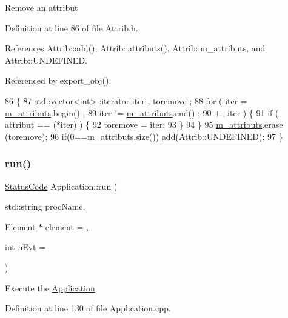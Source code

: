 Remove an attribut 

Definition at line 86 of file Attrib.\+h.



References Attrib\+::add(), Attrib\+::attributs(), Attrib\+::m\+\_\+attributs, and Attrib\+::\+U\+N\+D\+E\+F\+I\+N\+ED.



Referenced by export\+\_\+obj().


\begin{DoxyCode}
86                                \{
87     std::vector<int>::iterator iter , toremove ;
88     \textcolor{keywordflow}{for} ( iter  = \hyperlink{classAttrib_ac4bd58a0cc6b38a3b711d609a3d3aacc}{m\_attributs}.begin() ;
89           iter != \hyperlink{classAttrib_ac4bd58a0cc6b38a3b711d609a3d3aacc}{m\_attributs}.end()   ;
90           ++iter ) \{
91       \textcolor{keywordflow}{if} ( attribut == (*iter) ) \{
92         toremove = iter;
93       \}
94     \}
95     \hyperlink{classAttrib_ac4bd58a0cc6b38a3b711d609a3d3aacc}{m\_attributs}.erase (toremove);
96     \textcolor{keywordflow}{if}(0==\hyperlink{classAttrib_ac4bd58a0cc6b38a3b711d609a3d3aacc}{m\_attributs}.size()) \hyperlink{classAttrib_a235f773af19c900264a190b00a3b4ad7}{add}(\hyperlink{classAttrib_a69e171d7cc6417835a5a306d3c764235a3a8da2ab97dda18aebab196fe4100531}{Attrib::UNDEFINED});
97   \}
\end{DoxyCode}
\mbox{\label{classApplication_a7fdd5bfee44e49896292f8964037384d}} 
\subsubsection{\texorpdfstring{run()}{run()}}
{\footnotesize\ttfamily \hyperlink{classStatusCode}{Status\+Code} Application\+::run (\begin{DoxyParamCaption}\item[{std\+::string}]{proc\+Name,  }\item[{\hyperlink{classElement}{Element} $\ast$}]{element = {},  }\item[{int}]{n\+Evt = {} }\end{DoxyParamCaption})}

Execute the \hyperlink{classApplication}{Application} 

Definition at line 130 of file Application.\+cpp.



